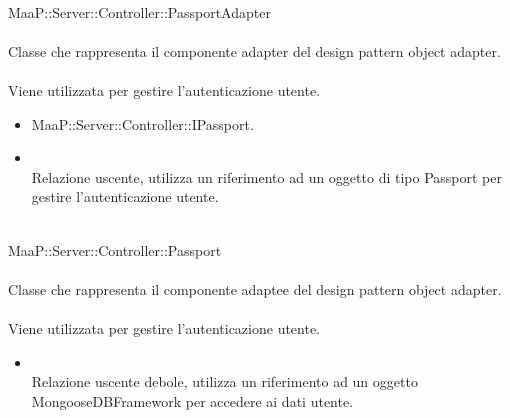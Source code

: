 \\
MaaP::Server::Controller::PassportAdapter\\
\\
Classe che rappresenta il componente adapter del design pattern object adapter.\\
\\
Viene utilizzata per gestire l'autenticazione utente.\\
\begin{itemize}
\item MaaP::Server::Controller::IPassport.
\end{itemize}
\begin{itemize}
\item{}\\
Relazione uscente, utilizza un riferimento ad un oggetto di tipo Passport per gestire l'autenticazione utente.
\end{itemize}

\\
MaaP::Server::Controller::Passport\\
\\
Classe che rappresenta il componente adaptee del design pattern object adapter.\\
\\
Viene utilizzata per gestire l'autenticazione utente.\\
\begin{itemize}
\item{}\\
Relazione uscente debole, utilizza un riferimento ad un oggetto MongooseDBFramework per accedere ai dati utente.
\end{itemize}

